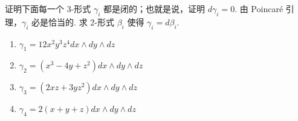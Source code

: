 \begin{question}\label{q:8-13}
证明下面每一个 3-形式 $\gamma_i$ 都是闭的；也就是说，证明 $d\gamma_i=0$. 由 Poincaré 引理，$\gamma_i$ 必是恰当的. 求 2-形式 $\beta_i$ 使得 $\gamma_i=d\beta_i$.
\begin{enumerate}
  \item[(a)] $\gamma_1=12x^2y^3z^4dx\wedge dy\wedge dz$
  \item[(b)] $\gamma_2=(x^3-4y+z^2)dx\wedge dy\wedge dz$
  \item[(c)] $\gamma_3=(2xz+3yz^2)dx\wedge dy\wedge dz$
  \item[(d)] $\gamma_4=2(x+y+z)dx\wedge dy\wedge dz$
\end{enumerate}
\end{question}
